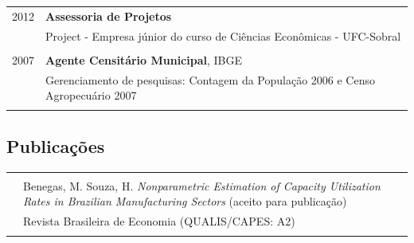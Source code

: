 \documentclass[a4paper,10pt]{article}
\begin{document}
\begin{flushleft}
\begin{tabular}{>{\raggedleft}p{2cm}|p{13cm}}
		\textsc{2012} & \textbf{Assessoria de Projetos} \\
		& Project - Empresa júnior do curso de Ciências Econômicas - UFC-Sobral \\
		\multicolumn{2}{c}{} \\

		\textsc{2007} & \textbf{Agente Censitário Municipal}, \textsc{IBGE} \\
		& Gerenciamento de pesquisas: Contagem da População 2006 e Censo Agropecuário 2007 \\
		\multicolumn{2}{c}{} \\

	\end{tabular}
	\end{flushleft}

	\center\subsection*{Publicações}
	\begin{flushleft}
		\begin{tabular}{>{\raggedleft}p{2cm}|p{13cm}}
			\multicolumn{2}{c}{} \\
			2023 & Benegas, M. Souza, H. \textit{Nonparametric Estimation of Capacity Utilization Rates in Brazilian Manufacturing Sectors} (aceito para publicação) \\
			& Revista Brasileira de Economia (QUALIS/CAPES: A2) \\
			\multicolumn{2}{c}{} \\
		\end{tabular}
	\end{flushleft}
\end{document}
